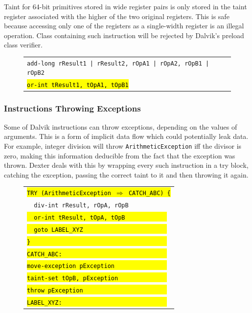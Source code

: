 \documentclass[12pt,twoside,notitlepage]{report}
\newcommand{\centerbox}[1] {
	\begin{center}
	\begin{footnotesize}
	\begin{tabular}{l}
		#1
	\end{tabular}
	\end{footnotesize}
	\end{center}
}
\newcommand{\asm}[1] {\texttt{#1}}
\newcommand{\asmExtra}[1] {\texttt{\hl{#1}}}
\begin{document}
Taint for 64-bit primitives stored in wide register pairs is only stored in the taint register associated with the higher of the two original registers. This is safe because accessing only one of the registers as a single-width register is an illegal operation. Class containing such instruction will be rejected by Dalvik's preload class verifier.

	\begin{figure}[H]
		\centerbox{
			\asm{add-long rResult1 | rResult2, rOpA1 | rOpA2, rOpB1 | rOpB2} \\
			\asmExtra{or-int tResult1, tOpA1, tOpB1}
		}
	\end{figure}

\subsubsection{Instructions Throwing Exceptions}

Some of Dalvik instructions can throw exceptions, depending on the values of arguments. This is a form of implicit data flow which could potentially leak data. For example, integer division will throw \verb$ArithmeticException$ iff the divisor is zero, making this information deducible from the fact that the exception was thrown. Dexter deals with this by wrapping every such instruction in a try block, catching the exception, passing the correct taint to it and then throwing it again.

	\begin{figure}[H]
		\centerbox{
			\asmExtra{TRY (ArithmeticException $\Rightarrow$ CATCH\_ABC) \{} \\
			\asm{~~div-int rResult, rOpA, rOpB} \\
			\asmExtra{~~or-int tResult, tOpA, tOpB~~~~~~~~~~~~} \\
			\asmExtra{~~goto LABEL\_XYZ~~~~~~~~~~~~~~~~~~~~~~~~} \\
			\asmExtra{\}~~~~~~~~~~~~~~~~~~~~~~~~~~~~~~~~~~~~~~~} \\
			\asmExtra{CATCH\_ABC:~~~~~~~~~~~~~~~~~~~~~~~~~~~~~~} \\
			\asmExtra{move-exception pException~~~~~~~~~~~~~~~} \\
			\asmExtra{taint-set tOpB, pException~~~~~~~~~~~~~~} \\
			\asmExtra{throw pException~~~~~~~~~~~~~~~~~~~~~~~~} \\	
			\asmExtra{LABEL\_XYZ:~~~~~~~~~~~~~~~~~~~~~~~~~~~~~~}
		}
	\end{figure}
\end{document}
